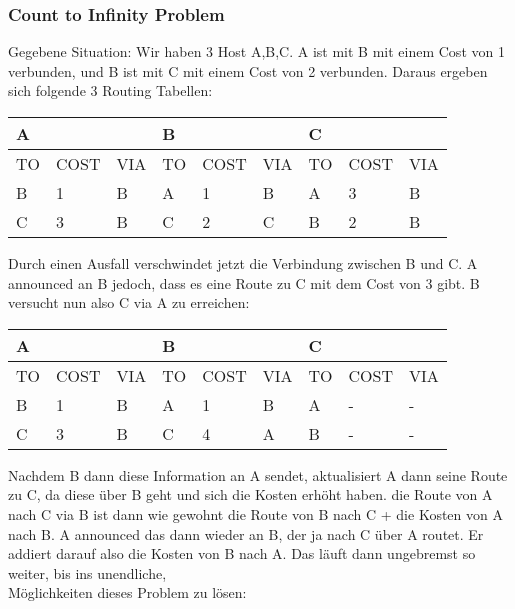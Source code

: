 		\subsubsection{Count to Infinity Problem} 
			Gegebene Situation: Wir haben 3 Host A,B,C. A ist mit B mit einem Cost von 1 verbunden, und B ist mit C mit einem Cost von 2 verbunden. Daraus ergeben sich folgende 3 Routing Tabellen:
			\begin{table}[h]
				\centering
				\begin{tabular}{|lll|lll|lll|}
				\hline
				\multicolumn{3}{|l|}{A} & \multicolumn{3}{l|}{B} & \multicolumn{3}{l|}{C} \\
				\hline
				\hline
				TO   & COST   & VIA   & TO   & COST   & VIA   & TO   & COST   & VIA   \\
				\hline
				B    & 1      & B     & A    & 1      & B     & A    & 3      & B     \\
				C    & 3      & B     & C    & 2      & C     & B    & 2      & B    \\
				\hline
				\end{tabular}
			\end{table}
			Durch einen Ausfall verschwindet jetzt die Verbindung zwischen B und C. A announced an B jedoch, dass es eine Route zu C mit dem Cost von 3 gibt. B versucht nun also C via A zu erreichen:
			\begin{table}[h]
				\centering
				\begin{tabular}{|lll|lll|lll|}
				\hline
				\multicolumn{3}{|l|}{A} & \multicolumn{3}{l|}{B} & \multicolumn{3}{l|}{C} \\
				\hline
				\hline
				TO   & COST   & VIA   & TO   & COST   & VIA   & TO   & COST   & VIA   \\
				\hline
				B    & 1      & B     & A    & 1      & B     & A    & -      & -     \\
				C    & 3      & B     & C    & 4      & A     & B    & -      & -    \\
				\hline
				\end{tabular}
			\end{table}
			Nachdem B dann diese Information an A sendet, aktualisiert A dann seine Route zu C, da diese über B geht und sich die Kosten erhöht haben. die Route von A nach C via B ist dann wie gewohnt die Route von B nach C + die Kosten von A nach B. A announced das dann wieder an B, der ja nach C über A routet. Er addiert darauf also die Kosten von B nach A. Das läuft dann ungebremst so weiter, bis ins unendliche, \\
			Möglichkeiten dieses Problem zu lösen:
			
